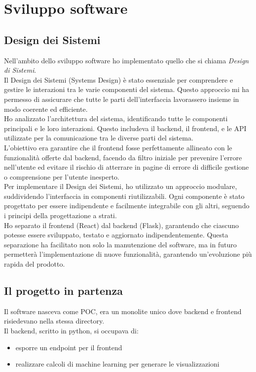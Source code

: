 \chapter{Sviluppo software}
\label{cap:sviluppo-software}

\section{Design dei Sistemi}
Nell'ambito dello sviluppo software ho implementato quello che si chiama \textit{Design di Sistemi}.\\
Il Design dei Sistemi (Systems Design) è stato essenziale per comprendere e gestire le interazioni tra le varie componenti del sistema. Questo approccio mi ha permesso di assicurare che tutte le parti dell'interfaccia lavorassero insieme in modo coerente ed efficiente.\\
Ho analizzato l'architettura del sistema, identificando tutte le componenti principali e le loro interazioni. Questo includeva il backend, il frontend, e le API utilizzate per la comunicazione tra le diverse parti del sistema.\\
L'obiettivo era garantire che il frontend fosse perfettamente allineato con le funzionalità offerte dal backend, facendo da filtro iniziale per prevenire l'errore nell'utente ed evitare il rischio di atterrare in pagine di errore di difficile gestione o comprensione per l'utente inesperto. \\

Per implementare il Design dei Sistemi, ho utilizzato un approccio modulare, suddividendo l'interfaccia in componenti riutilizzabili. Ogni componente è stato progettato per essere indipendente e facilmente integrabile con gli altri, seguendo i principi della progettazione a strati.\\
Ho separato il frontend (React) dal backend (Flask), garantendo che ciascuno potesse essere sviluppato, testato e aggiornato indipendentemente. Questa separazione ha facilitato non solo la manutenzione del software, ma in futuro permetterà l'implementazione di nuove funzionalità, garantendo un'evoluzione più rapida del prodotto.\\


\section{Il progetto in partenza}
Il software nasceva come POC, era un monolite unico dove backend e frontend risiedevano nella stessa directory.\\
Il backend, scritto in python, si occupava di:
\begin{itemize}
    \item esporre un endpoint per il frontend 
    \item realizzare calcoli di machine learning per generare le visualizzazioni 
\end{itemize}

